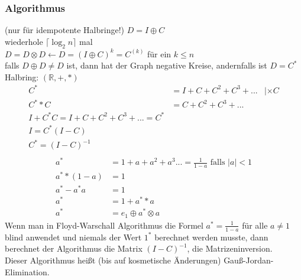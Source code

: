 \subsubsection{Algorithmus}
(nur für idempotente Halbringe!)
$D  = I \oplus C$\\
wiederhole $\lceil \log_2 n \rceil$ mal\\
$D = D \otimes D \leftarrow D = (I\oplus C)^k = C^{(k)}$ für ein $k\leq n$\\
falls $D\oplus D \neq D$ ist, dann hat der Graph negative Kreise, andernfalls ist $D=C^*$\\
Halbring: $(\mathbb{R}, + , *)$\\
\begin{align*}
C^* &= I + C + C^2 + C^3 + ... &| \times C\\
C^**C &= C + C^2 + C^3 + ...\\
I + C^* C = I + C + C^2 + C^3 + ... = C^*\\
I = C^* (I-C)\\
C^* = (I-C)^{-1}\\
\end{align*}
\begin{align*}
a^* &= 1 + a +a^2 + a^3 ... = \frac{1}{1-a} \text{ falls } |a| < 1\\
a^* * (1-a) &= 1\\
a^* - a^*a &=1\\
a^* &= 1 + a^**a\\
a^* &= e_1 \oplus a^* \otimes a
\end{align*}
Wenn man in Floyd-Warschall Algorithmus die Formel $a^* = \frac{1}{1-a}$ für alle $a \neq 1$ blind anwendet und niemals der Wert $1^*$ berechnet werden musste, dann berechnet der Algorithmus die Matrix $(I-C)^{-1}$, die Matrizeninversion.\\
Dieser Algorithmus heißt (bis auf kosmetische Änderungen) Gauß-Jordan-Elimination.